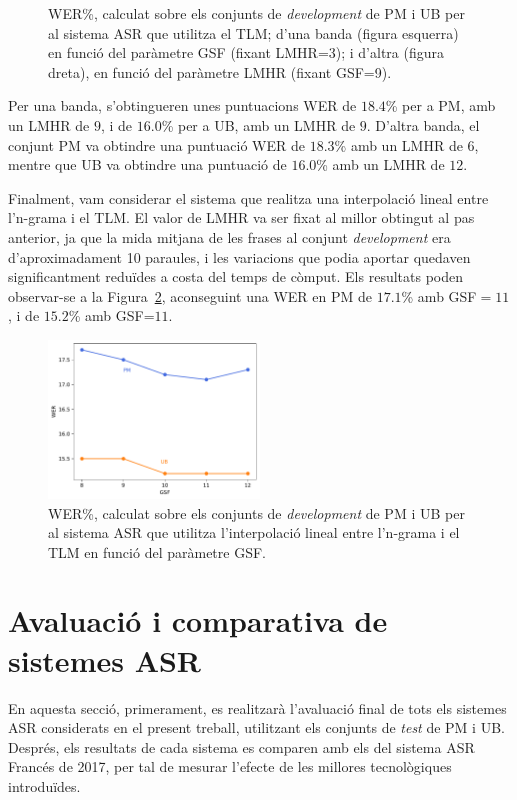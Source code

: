 \begin{figure}[ht!]
\begin{subfigure}{0.45\textwidth}
    \end{subfigure}
    \caption{}
    \caption{WER\%, calculat sobre els conjunts de \textit{development} de PM i UB per al sistema ASR que utilitza el TLM; d'una banda (figura esquerra) en funció del paràmetre GSF (fixant LMHR=3); i d'altra (figura dreta), en funció del paràmetre LMHR (fixant GSF=9).}
    \label{fig:gsf_newlm_tlm}
\end{figure}

Per una banda, s'obtingueren unes puntuacions WER de $18.4$\% per a PM, amb un LMHR de $9$, i de $16.0$\% per a UB, amb un LMHR de $9$. D'altra banda, el conjunt PM va obtindre una puntuació WER de $18.3$\% amb un LMHR de $6$, mentre que UB va obtindre una puntuació de $16.0$\% amb un LMHR de $12$.

Finalment, vam considerar el sistema que realitza una interpolació lineal entre l'n-grama i el TLM. El valor de LMHR va ser fixat al millor obtingut al pas anterior, ja que la mida mitjana de les frases al conjunt \textit{development} era d'aproximadament 10 paraules, i les variacions que podia aportar quedaven significantment reduïdes a costa del temps de còmput.
Els resultats poden observar-se a la Figura~\ref{fig:gsf_tlm_ngram}, aconseguint una WER en PM de $17.1$\% amb GSF$=11$, i de $15.2$\% amb GSF=$11$.

\begin{figure}[ht!]
    \centering
    \includegraphics[width=0.5\textwidth]{figuras/gsf_tlm_ngram.pdf}
    \caption{WER\%, calculat sobre els conjunts de \textit{development} de PM i UB per al sistema ASR que utilitza l'interpolació lineal entre l'n-grama i el TLM en funció del paràmetre GSF.}
    \label{fig:gsf_tlm_ngram}
\end{figure}

\section{Avaluació i comparativa de sistemes ASR}
\label{cap05_aval}
En aquesta secció, primerament, es realitzarà l'avaluació final de tots els sistemes ASR considerats en el present treball, utilitzant els conjunts de \textit{test} de PM i UB. Després, els resultats de cada sistema es comparen amb els del sistema ASR Francés de 2017, per tal de mesurar l'efecte de les millores tecnològiques introduïdes.

